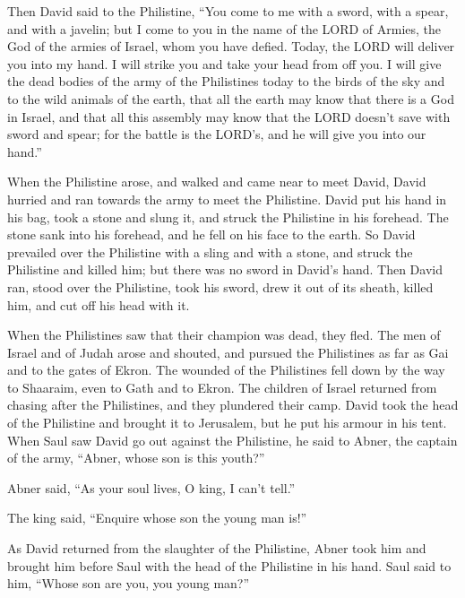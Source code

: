  Then David said to the Philistine, ``You come to me with
a sword, with a spear, and with a javelin; but I come to you in the name
of the LORD of Armies, the God of the armies of Israel, whom you have
defied.  Today, the LORD will deliver you into my hand. I
will strike you and take your head from off you. I will give the dead
bodies of the army of the Philistines today to the birds of the sky and
to the wild animals of the earth, that all the earth may know that there
is a God in Israel,  and that all this assembly may know
that the LORD doesn't save with sword and spear; for the battle is the
LORD's, and he will give you into our hand.''

 When the Philistine arose, and walked and came near to
meet David, David hurried and ran towards the army to meet the
Philistine.  David put his hand in his bag, took a stone
and slung it, and struck the Philistine in his forehead. The stone sank
into his forehead, and he fell on his face to the earth. 
So David prevailed over the Philistine with a sling and with a stone,
and struck the Philistine and killed him; but there was no sword in
David's hand.  Then David ran, stood over the Philistine,
took his sword, drew it out of its sheath, killed him, and cut off his
head with it.

When the Philistines saw that their champion was dead, they fled.
 The men of Israel and of Judah arose and shouted, and
pursued the Philistines as far as Gai and to the gates of Ekron. The
wounded of the Philistines fell down by the way to Shaaraim, even to
Gath and to Ekron.  The children of Israel returned from
chasing after the Philistines, and they plundered their camp.
 David took the head of the Philistine and brought it to
Jerusalem, but he put his armour in his tent.  When Saul
saw David go out against the Philistine, he said to Abner, the captain
of the army, ``Abner, whose son is this youth?''

Abner said, ``As your soul lives, O king, I can't tell.''

 The king said, ``Enquire whose son the young man is!''

 As David returned from the slaughter of the Philistine,
Abner took him and brought him before Saul with the head of the
Philistine in his hand.  Saul said to him, ``Whose son
are you, you young man?''

